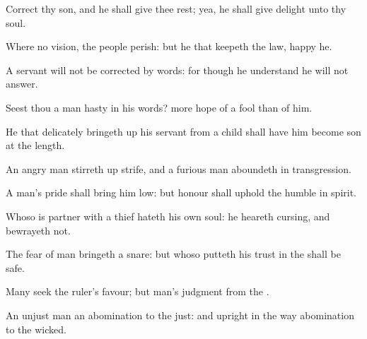 {Correct thy
son, and he shall give thee
rest; yea, he shall
give
delight unto thy
soul.

Where
{} no
vision, the
people
perish: but he that
keepeth the
law,
happy
{} he.

A
servant will not be
corrected by
words: for though he
understand he will not
answer.

Seest thou a
man
{}
hasty in his
words?
{} more
hope of a
fool than of him.

He that delicately bringeth
up his
servant from a
child shall have him become
{}
son at the
length.

An
angry
man stirreth
up
strife, and a
furious
man aboundeth
in
transgression.

A
man’s
pride shall bring him
low: but
honour shall
uphold the
humble in
spirit.

Whoso is
partner with a
thief
hateth his own
soul: he
heareth
cursing, and
bewrayeth
{} not.

The
fear of
man
bringeth a
snare: but whoso putteth his
trust in the
{} shall be
safe.

Many
seek the
ruler’s
favour; but
{}
man’s
judgment
{} from the
{}.

An
unjust
man
{} an
abomination to the
just: and
{}
upright in the
way
{}
abomination to the
wicked.




\par }
